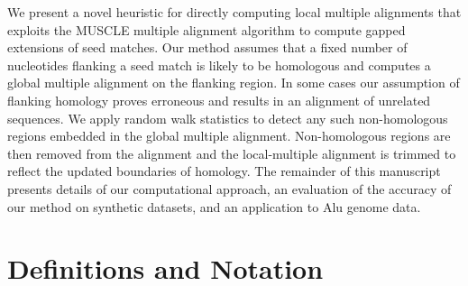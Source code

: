 \documentclass[twoside,11pt]{article}
\begin{document}
We present a novel heuristic for directly computing local multiple alignments that exploits the MUSCLE multiple alignment algorithm to compute gapped extensions of seed matches.  Our method assumes that a fixed number of nucleotides flanking a seed match is likely to be homologous and computes a global multiple alignment on the flanking region.  In some cases our assumption of flanking homology proves erroneous and results in an alignment of unrelated sequences.  We apply random walk statistics to detect any such non-homologous regions embedded in the global multiple alignment.  Non-homologous regions are then removed from the alignment and the local-multiple alignment is trimmed to reflect the updated boundaries of homology.  The remainder of this manuscript presents details of our computational approach, an evaluation of the accuracy of our method on synthetic datasets, and an application to Alu genome data.



\label{sec:overview}
\section{Definitions and Notation}
\end{document}
